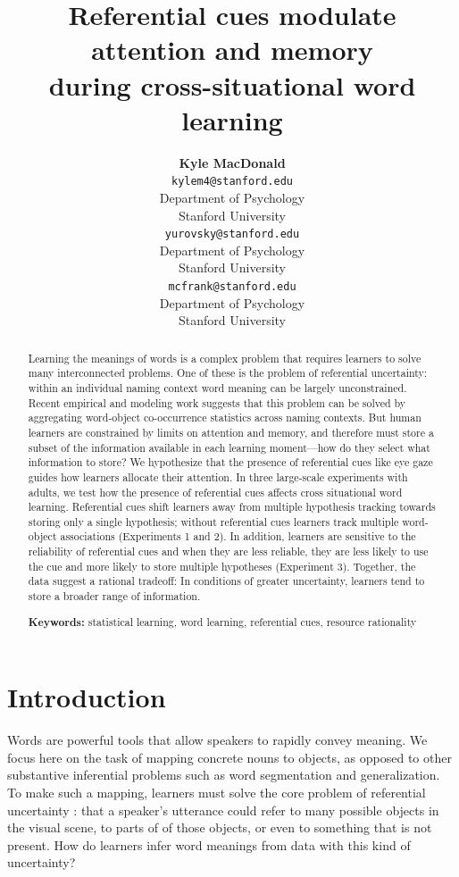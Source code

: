 \documentclass[10pt,letterpaper]{article}
\title{Referential cues modulate attention and memory \\
during cross-situational word learning}
\author{{\large \bf Kyle MacDonald} \\ \texttt{kylem4@stanford.edu} \\ Department of Psychology \\ Stanford University
  \And {\large \bf  Daniel Yurovsky} \\ \texttt{yurovsky@stanford.edu} \\ Department of Psychology \\ Stanford University
  \And {\large \bf Michael C. Frank} \\  \texttt{mcfrank@stanford.edu} \\Department of Psychology \\ Stanford University}
\begin{document}

\maketitle


\begin{abstract}
Learning the meanings of words is a complex problem that requires learners to solve many interconnected problems. One of these is the problem of referential uncertainty: within an individual naming context word meaning can be largely unconstrained. Recent empirical and modeling work suggests that this problem can be solved by aggregating word-object co-occurrence statistics across naming contexts. But human learners are constrained by limits on attention and memory, and therefore must store a subset of the information available in each learning moment---how do they select what information to store? We hypothesize that the presence of referential cues like eye gaze guides how learners allocate their attention. In three large-scale experiments with adults, we test how the presence of referential cues affects cross situational word learning. Referential cues shift learners away from multiple hypothesis tracking towards storing only a single hypothesis; without referential cues learners track multiple word-object associations (Experiments 1 and 2). In addition, learners are sensitive to the reliability of referential cues and when they are less reliable, they are less likely to use the cue and more likely to store multiple hypotheses (Experiment 3).  Together, the data suggest a rational tradeoff: In conditions of greater uncertainty, learners tend to store a broader range of information. 

\textbf{Keywords:} 
statistical learning, word learning, referential cues, resource rationality
\end{abstract}


\section{Introduction}

Words are powerful tools that allow speakers to rapidly convey meaning. We focus here on the task of mapping concrete nouns to objects, as opposed to other substantive inferential problems such as word segmentation and generalization. To make such a mapping, learners must solve the core problem of referential uncertainty \cite{quine19600}: that a speaker's utterance could refer to many possible objects in the visual scene, to parts of of those objects, or even to something that is not present. How do learners infer word meanings from data with this kind of uncertainty?
\end{document}
